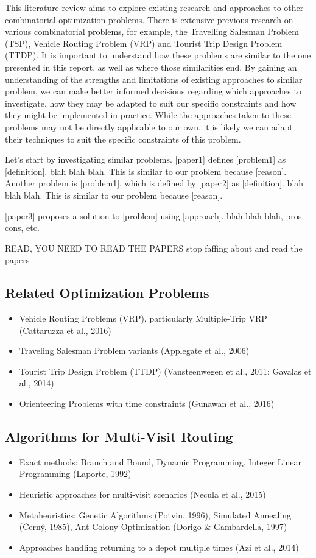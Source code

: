 This literature review aims to explore existing research and approaches to other combinatorial optimization problems.
There is extensive previous research on various combinatorial problems, for example, the Travelling Salesman
Problem (TSP), Vehicle Routing Problem (VRP) and Tourist Trip Design Problem (TTDP).
It is important to understand how these problems are similar to the one presented in this report, as well as where
those similarities end.
By gaining an understanding of the strengths and limitations of existing approaches to similar problem, we can make
better informed decisions regarding which approaches to investigate, how they may be adapted to suit our specific
constraints and how they might be implemented in practice.
While the approaches taken to these problems may not be directly applicable to our own, it is likely we can adapt their
techniques to suit the specific constraints of this problem.

Let's start by investigating similar problems. [paper1] defines [problem1] as [definition].
blah blah blah.
This is similar to our problem because [reason].
Another problem is [problem1], which is defined by [paper2] as [definition].
blah blah blah.
This is similar to our problem because [reason].

[paper3] proposes a solution to [problem] using [approach].
blah blah blah, pros, cons, etc.

READ, YOU NEED TO READ THE PAPERS stop faffing about and read the papers


\subsection{Related Optimization Problems}
\begin{itemize}
    \item Vehicle Routing Problems (VRP), particularly Multiple-Trip VRP (Cattaruzza et al., 2016)
    \item Traveling Salesman Problem variants (Applegate et al., 2006)
    \item Tourist Trip Design Problem (TTDP) (Vansteenwegen et al., 2011; Gavalas et al., 2014)
    \item Orienteering Problems with time constraints (Gunawan et al., 2016)
\end{itemize}

\subsection{Algorithms for Multi-Visit Routing}
\begin{itemize}
    \item Exact methods: Branch and Bound, Dynamic Programming, Integer Linear Programming (Laporte, 1992)
    \item Heuristic approaches for multi-visit scenarios (Necula et al., 2015)
    \item Metaheuristics: Genetic Algorithms (Potvin, 1996), Simulated Annealing (Černý, 1985), Ant Colony Optimization (Dorigo \& Gambardella, 1997)
    \item Approaches handling returning to a depot multiple times (Azi et al., 2014)
\end{itemize}

